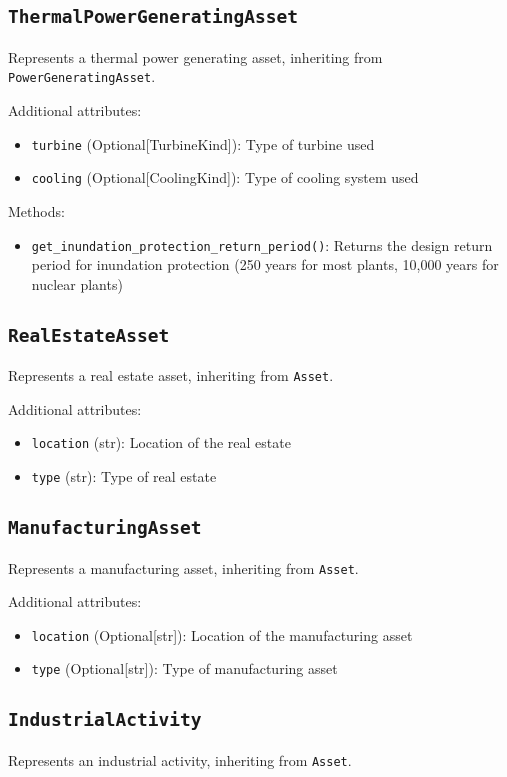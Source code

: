 \documentclass{article}
\begin{document}
\subsection{\texttt{ThermalPowerGeneratingAsset}}
Represents a thermal power generating asset, inheriting from \texttt{PowerGeneratingAsset}.

Additional attributes:
\begin{itemize}
    \item \texttt{turbine} (Optional[TurbineKind]): Type of turbine used
    \item \texttt{cooling} (Optional[CoolingKind]): Type of cooling system used
\end{itemize}

Methods:
\begin{itemize}
    \item \texttt{get\_inundation\_protection\_return\_period()}: Returns the design return period for inundation protection (250 years for most plants, 10,000 years for nuclear plants)
\end{itemize}

\subsection{\texttt{RealEstateAsset}}
Represents a real estate asset, inheriting from \texttt{Asset}.

Additional attributes:
\begin{itemize}
    \item \texttt{location} (str): Location of the real estate
    \item \texttt{type} (str): Type of real estate
\end{itemize}

\subsection{\texttt{ManufacturingAsset}}
Represents a manufacturing asset, inheriting from \texttt{Asset}.

Additional attributes:
\begin{itemize}
    \item \texttt{location} (Optional[str]): Location of the manufacturing asset
    \item \texttt{type} (Optional[str]): Type of manufacturing asset
\end{itemize}

\subsection{\texttt{IndustrialActivity}}
Represents an industrial activity, inheriting from \texttt{Asset}.
\end{document}
